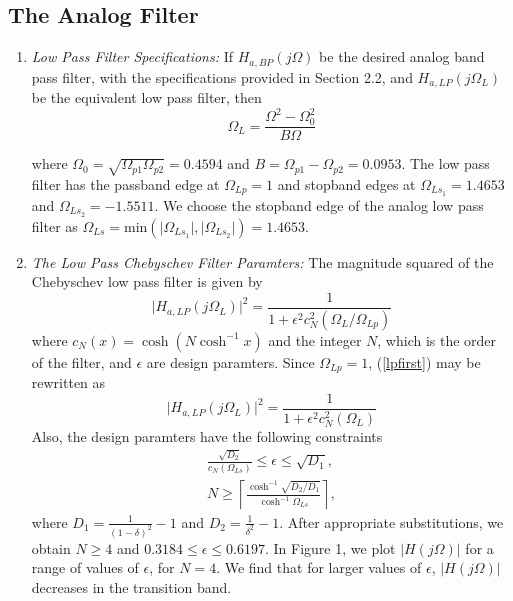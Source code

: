 \documentclass{article}
\begin{document}
\subsection{The Analog Filter}
\begin{enumerate}

\item {\em Low Pass Filter Specifications:}  If $H_{a, BP}(j\Omega)$ be the desired analog band
pass filter,  with the specifications provided in Section 2.2, and $H_{a,LP}(j\Omega_L)$ 
be the equivalent low pass filter, then
\begin{equation}
\label{transition}
\Omega_L = \frac{\Omega^2 - \Omega_0^2}{B\Omega}
\end{equation}

where $\Omega_0 = \sqrt{\Omega_{p1}\Omega_{p2}} = 0.4594$ and $B = \Omega_{p1} - \Omega_{p2} = 0.0953$.  The low pass filter has
the passband edge at $\Omega_{Lp} = 1$ and stopband edges at $\Omega_{Ls_1} = 1.4653$ and $\Omega_{Ls_2} = -1.5511$.  We choose the stopband edge of the analog low pass filter as $\Omega_{Ls} = \mbox{min}(\vert \Omega_{Ls_1}\vert,\vert \Omega_{Ls_2}\vert) = 1.4653$.

\item {\em The Low Pass Chebyschev Filter Paramters:}  The magnitude squared of the Chebyschev low pass filter is given by 
\begin{equation}
\label{lpfirst}
\vert H_{a,LP}(j\Omega_L)\vert^2 = \frac{1}{1 + \epsilon^2c_N^2(\Omega_L/\Omega_{Lp})}
\end{equation}
where $c_N(x) = \cosh(N \cosh^{-1}x)$ and the integer $N$, which is the order of the filter, and $\epsilon$ are design paramters.  Since $\Omega_{Lp} = 1$, (\ref{lpfirst}) may be rewritten as
\begin{equation}
\label{lpsecond}
\vert H_{a,LP}(j\Omega_L)\vert^2 = \frac{1}{1 + \epsilon^2c_N^2(\Omega_L)}
\end{equation}
Also, the design paramters have the following constraints
\begin{eqnarray}
\label{lpdesign}
\frac{\sqrt{D_2}}{c_N(\Omega_{Ls})} \leq \epsilon \leq \sqrt{D_1}, \nonumber \\
N \geq \left\lceil \frac{\cosh^{-1}\sqrt{D_2/D_1}}{\cosh^{-1}\Omega_{Ls}} \right\rceil,
\end{eqnarray}
where $D_1 = \frac{1}{(1 - \delta)^2}-1$ and $D_2 = \frac{1}{\delta^2} - 1$.  After appropriate substitutions,
we obtain $N \geq 4$ and $0.3184 \leq \epsilon \leq 0.6197$.  In Figure 1, we plot $\vert H(j\Omega)\vert$ for a range of values of $\epsilon$, for $N = 4$.  We find that for larger values of $\epsilon$, $|H(j\Omega)|$ decreases in the transition band. 
 

\end{enumerate}
\end{document}

